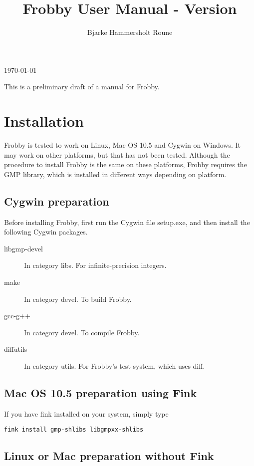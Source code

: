 \documentclass{amsart}
\author{Bjarke Hammersholt Roune}
\title{Frobby User Manual - Version \frobbyVersion}
\theoremstyle{definition}
\begin{document}
\maketitle
\today

\tableofcontents

This is a preliminary draft of a manual for Frobby.

\section{Installation}

Frobby is tested to work on Linux, Mac OS 10.5 and Cygwin on
Windows. It may work on other platforms, but that has not been
tested. Although the procedure to install Frobby is the same on these
platforms, Frobby requires the GMP library, which is installed in
different ways depending on platform.

\subsection{Cygwin preparation}

Before installing Frobby, first run the Cygwin file setup.exe, and
then install the following Cygwin packages.

\begin{description}
\item[libgmp-devel] In category libs. For infinite-precision integers.
\item[make] In category devel. To build Frobby.
\item[gcc-g++] In category devel. To compile Frobby.
\item[diffutils] In category utils. For Frobby's test system, which uses diff.
\end{description}

\subsection{Mac OS 10.5 preparation using Fink}

If you have fink installed on your system, simply type

\begin{verbatim}
fink install gmp-shlibs libgmpxx-shlibs
\end{verbatim}

\subsection{Linux or Mac preparation without Fink}
\end{document}
